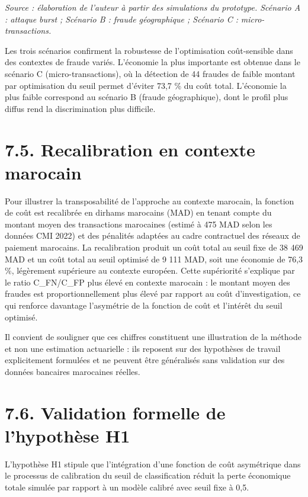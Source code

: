 \emph{Source : élaboration de l'auteur à partir des simulations du prototype. Scénario A : attaque }\emph{burst}\emph{ ; Scénario B : fraude géographique ; Scénario C : }\emph{micro-transactions}\emph{.}

Les trois scénarios confirment la robustesse de l'optimisation coût-sensible dans des contextes de fraude variés. L'économie la plus importante est obtenue dans le scénario C (micro-transactions), où la détection de 44 fraudes de faible montant par optimisation du seuil permet d'éviter 73,7 \% du coût total. L'économie la plus faible correspond au scénario B (fraude géographique), dont le profil plus diffus rend la discrimination plus difficile.

\section{7.5. Recalibration en contexte marocain}

Pour illustrer la transposabilité de l'approche au contexte marocain, la fonction de coût est recalibrée en dirhams marocains (MAD) en tenant compte du montant moyen des transactions marocaines (estimé à 475 MAD selon les données CMI 2022) et des pénalités adaptées au cadre contractuel des réseaux de paiement marocains. La recalibration produit un coût total au seuil fixe de 38 469 MAD et un coût total au seuil optimisé de 9 111 MAD, soit une économie de 76,3 \%, légèrement supérieure au contexte européen. Cette supériorité s'explique par le ratio C\_FN/C\_FP plus élevé en contexte marocain : le montant moyen des fraudes est proportionnellement plus élevé par rapport au coût d'investigation, ce qui renforce davantage l'asymétrie de la fonction de coût et l'intérêt du seuil optimisé.

Il convient de souligner que ces chiffres constituent une illustration de la méthode et non une estimation actuarielle : ils reposent sur des hypothèses de travail explicitement formulées et ne peuvent être généralisés sans validation sur des données bancaires marocaines réelles.

\section{7.6. Validation formelle de l'hypothèse H1}

L'hypothèse H1 stipule que l'intégration d'une fonction de coût asymétrique dans le processus de calibration du seuil de classification réduit la perte économique totale simulée par rapport à un modèle calibré avec seuil fixe à 0,5.

